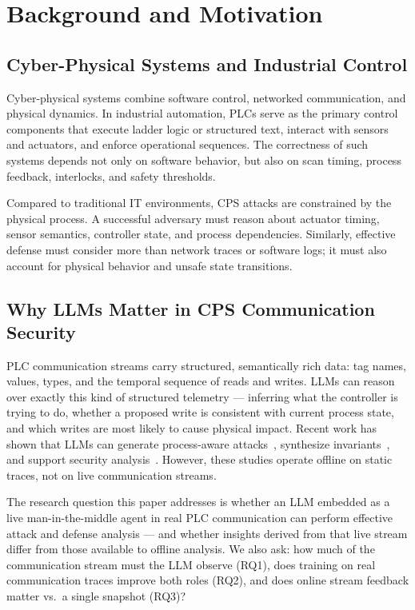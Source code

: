 \section{Background and Motivation}
\label{sec:background}

\subsection{Cyber-Physical Systems and Industrial Control}

Cyber-physical systems combine software control, networked communication, and physical dynamics. In industrial automation, PLCs serve as the primary control components that execute ladder logic or structured text, interact with sensors and actuators, and enforce operational sequences. The correctness of such systems depends not only on software behavior, but also on scan timing, process feedback, interlocks, and safety thresholds.

Compared to traditional IT environments, CPS attacks are constrained by the physical process. A successful adversary must reason about actuator timing, sensor semantics, controller state, and process dependencies. Similarly, effective defense must consider more than network traces or software logs; it must also account for physical behavior and unsafe state transitions.

\subsection{Why LLMs Matter in CPS Communication Security}

PLC communication streams carry structured, semantically rich data: tag names, values, types, and the temporal sequence of reads and writes. LLMs can reason over exactly this kind of structured telemetry --- inferring what the controller is trying to do, whether a proposed write is consistent with current process state, and which writes are most likely to cause physical impact. Recent work has shown that LLMs can generate process-aware attacks~\cite{ahmed2025attackllm}, synthesize invariants~\cite{fakih2024llm4plc}, and support security analysis~\cite{xu2024llm_cybersec_survey}. However, these studies operate offline on static traces, not on live communication streams.

The research question this paper addresses is whether an LLM embedded as a live man-in-the-middle agent in real PLC communication can perform effective attack and defense analysis --- and whether insights derived from that live stream differ from those available to offline analysis. We also ask: how much of the communication stream must the LLM observe (RQ1), does training on real communication traces improve both roles (RQ2), and does online stream feedback matter vs.\ a single snapshot (RQ3)?

